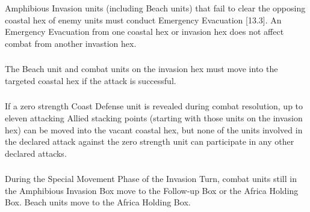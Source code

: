 \subsubsection{} Amphibious Invasion units (including Beach units) that fail to clear the opposing coastal hex of enemy units must conduct Emergency Evacuation [13.3]. An Emergency Evacuation from one coastal hex or invasion hex does not affect combat from another invastion hex.

\subsubsection{} The Beach unit and combat units on the invasion hex must move into the targeted coastal hex if the attack is successful.

\subsubsection{} If a zero strength Coast Defense unit is revealed during combat resolution, up to eleven attacking Allied stacking points (starting with those units on the invasion hex) can be moved into the vacant coastal hex, but none of the units involved in the declared attack against the zero strength unit can participate in any other declared attacks.

\subsubsection{} During the Special Movement Phase of the Invasion Turn, combat units still in the Amphibious Invasion Box move to the Follow-up Box or the Africa Holding Box. Beach units move to the Africa Holding Box.
